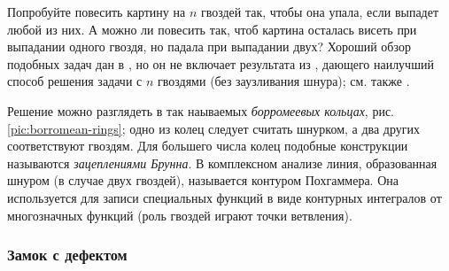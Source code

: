 \begin{addedbytheeditors}
Попробуйте повесить картину на $n$ гвоздей так, чтобы она упала, если выпадет любой из них.
А можно ли повесить так, чтоб картина осталась висеть при выпадании одного гвоздя, но падала при выпадании двух?
Хороший обзор подобных задач дан в \cite{demaine2014}, но он не включает результата из \cite{gartside-greenwood}, дающего наилучший способ решения задачи с $n$ гвоздями (без заузливания шнура); см. также \cite{epifanov}.

Решение можно разглядеть в так наываемых \emph{борромеевых кольцах}, рис. \ref{pic:borromean-rings};
одно из колец следует считать шнурком, а два других соответствуют гвоздям.
Для большего числа колец подобные конструкции называются \emph{зацеплениями Брунна}.
В комплексном анализе линия, образованная шнуром (в случае двух гвоздей), называется контуром Похгаммера.
Она используется для записи специальных функций в виде контурных интегралов от многозначных функций (роль гвоздей играют точки ветвления).
\pr
\end{addedbytheeditors}

\subsubsection*{Замок с дефектом}

